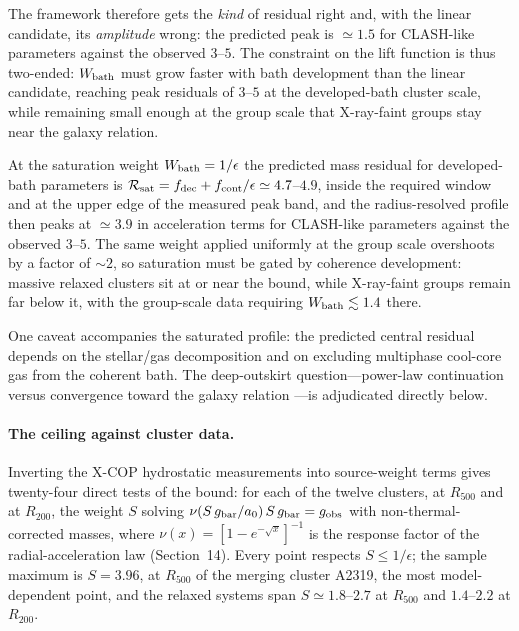 \documentclass[11pt]{article}
\begin{document}
The framework therefore gets the \emph{kind} of residual right and, with the linear candidate, its \emph{amplitude} wrong: the predicted peak is $\simeq1.5$ for CLASH-like parameters against the observed $3$--$5$. The constraint on the lift function is thus two-ended: $W_{\rm bath}$ must grow faster with bath development than the linear candidate, reaching peak residuals of $3$--$5$ at the developed-bath cluster scale, while remaining small enough at the group scale that X-ray-faint groups stay near the galaxy relation.

At the saturation weight $W_{\rm bath}=1/\epsilon$ the predicted mass residual for developed-bath parameters is $\mathcal R_{\rm sat}=f_{\rm dec}+f_{\rm cont}/\epsilon\simeq4.7$--$4.9$, inside the required window and at the upper edge of the measured peak band, and the radius-resolved profile then peaks at $\simeq3.9$ in acceleration terms for CLASH-like parameters against the observed $3$--$5$. The same weight applied uniformly at the group scale overshoots by a factor of $\sim2$, so saturation must be gated by coherence development: massive relaxed clusters sit at or near the bound, while X-ray-faint groups remain far below it, with the group-scale data requiring $W_{\rm bath}\lesssim1.4$ there.

One caveat accompanies the saturated profile: the predicted central residual depends on the stellar/gas decomposition and on excluding multiphase cool-core gas from the coherent bath. The deep-outskirt question---power-law continuation \citep{Tian2020} versus convergence toward the galaxy relation \citep{Li2023}---is adjudicated directly below.

\paragraph{The ceiling against cluster data.}
Inverting the X-COP hydrostatic measurements \citep{Eckert2019} into source-weight terms gives twenty-four direct tests of the bound: for each of the twelve clusters, at $R_{500}$ and at $R_{200}$, the weight $S$ solving $\nu(S\,g_{\rm bar}/a_0)\,S\,g_{\rm bar}=g_{\rm obs}$ with non-thermal-corrected masses, where $\nu(x)=[1-e^{-\sqrt{x}}]^{-1}$ is the response factor of the radial-acceleration law (Section~14). Every point respects $S\le1/\epsilon$; the sample maximum is $S=3.96$, at $R_{500}$ of the merging cluster A2319, the most model-dependent point, and the relaxed systems span $S\simeq1.8$--$2.7$ at $R_{500}$ and $1.4$--$2.2$ at $R_{200}$.
\end{document}
